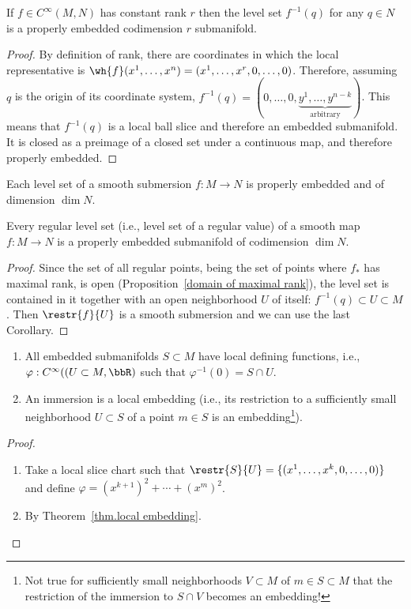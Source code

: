 \begin{thm}\label{thm level set submanifold}
    If $f\in C^\infty(M,N)$ has constant rank $r$ then the level set $f^{-1}(q)$ for any $q\in N$ is a properly embedded codimension $r$ submanifold.
\end{thm}
\begin{proof}
    By definition of rank, there are coordinates in which the local representative is $\wh{f}(x^1,\ldots,x^n)=(x^1,\ldots,x^r,0,\ldots,0)$. Therefore, assuming $q$ is the origin of its coordinate system, $f^{-1}(q)=(0,\ldots,0,\underbrace{y^1,\ldots,y^{n-k}}_{\text{arbitrary}})$. This means that $f^{-1}(q)$ is a local ball slice and therefore an embedded submanifold. It is closed as a preimage of a closed set under a continuous map, and therefore properly embedded.
\end{proof}
\begin{cor}
    Each level set of a smooth submersion $f:M\to N$ is properly embedded and of dimension $\dim N$.
\end{cor}
\begin{cor}
    Every regular level set (i.e., level set of a regular value) of a smooth map $f:M\to N$ is a properly embedded submanifold of codimension $\dim N$.
\end{cor}
\begin{proof}
    Since the set of all regular points, being the set of points where $f_{\ast}$ has maximal rank, is open (Proposition~\ref{domain of maximal rank}), the level set is contained in it together with an open neighborhood $U$ of itself: $f^{-1}(q)\subset U\subset M$. Then $\restr{f}{U}$ is a smooth submersion and we can use the last Corollary.
\end{proof}

\begin{prop}
\begin{enumerate}
    \item All embedded submanifolds $S\subset M$ have local defining functions, i.e., $\varphi:C^\infty((U\subset M, \bbR )$ such that $\varphi^{-1}(0)=S\cap U$.
    \item An immersion is a local embedding (i.e., its restriction to a sufficiently small neighborhood $U\subset S$ of a point $m\in S$ is an embedding\footnote{Not true for sufficiently small neighborhoods $V\subset M$ of $m\in S\subset M$ that the restriction of the immersion to $S\cap V$ becomes an embedding!}).
\end{enumerate}
\end{prop}
\begin{proof}
\begin{enumerate}
    \item Take a local slice chart such that $\restr{S}{U}=\{(x^1,\ldots,x^k,0,\ldots,0)\}$ and define $\varphi=(x^{k+1})^2+\cdots+(x^m)^2$.
    \item By Theorem~\ref{thm.local embedding}.
\end{enumerate}
\end{proof}

